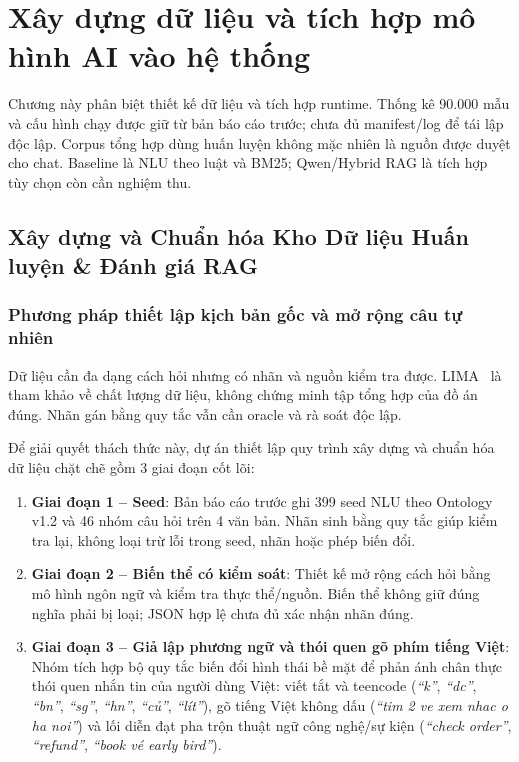 \chapter{Xây dựng dữ liệu và tích hợp mô hình AI vào hệ thống}
\label{chap:training_integration}

Chương này phân biệt thiết kế dữ liệu và tích hợp runtime. Thống kê 90.000 mẫu và cấu hình chạy được giữ từ bản báo cáo trước; chưa đủ manifest/log để tái lập độc lập. Corpus tổng hợp dùng huấn luyện không mặc nhiên là nguồn được duyệt cho chat. Baseline là NLU theo luật và BM25; Qwen/Hybrid RAG là tích hợp tùy chọn còn cần nghiệm thu.

\section{Xây dựng và Chuẩn hóa Kho Dữ liệu Huấn luyện \& Đánh giá RAG}
\label{sec:data_generator_pipeline}

\subsection{Phương pháp thiết lập kịch bản gốc và mở rộng câu tự nhiên}

Dữ liệu cần đa dạng cách hỏi nhưng có nhãn và nguồn kiểm tra được. LIMA~\cite{lima_zhou_2023} là tham khảo về chất lượng dữ liệu, không chứng minh tập tổng hợp của đồ án đúng. Nhãn gán bằng quy tắc vẫn cần oracle và rà soát độc lập.

Để giải quyết thách thức này, dự án thiết lập quy trình xây dựng và chuẩn hóa dữ liệu chặt chẽ gồm 3 giai đoạn cốt lõi:
\begin{enumerate}[nosep]
  \item \textbf{Giai đoạn 1 -- Seed}: Bản báo cáo trước ghi 399 seed NLU theo Ontology v1.2 và 46 nhóm câu hỏi trên 4 văn bản. Nhãn sinh bằng quy tắc giúp kiểm tra lại, không loại trừ lỗi trong seed, nhãn hoặc phép biến đổi.
  \item \textbf{Giai đoạn 2 -- Biến thể có kiểm soát}: Thiết kế mở rộng cách hỏi bằng mô hình ngôn ngữ và kiểm tra thực thể/nguồn. Biến thể không giữ đúng nghĩa phải bị loại; JSON hợp lệ chưa đủ xác nhận nhãn đúng.
  \item \textbf{Giai đoạn 3 -- Giả lập phương ngữ và thói quen gõ phím tiếng Việt}: Nhóm tích hợp bộ quy tắc biến đổi hình thái bề mặt để phản ánh chân thực thói quen nhắn tin của người dùng Việt: viết tắt và teencode (\textit{``k''}, \textit{``dc''}, \textit{``bn''}, \textit{``sg''}, \textit{``hn''}, \textit{``củ''}, \textit{``lít''}), gõ tiếng Việt không dấu (\textit{``tim 2 ve xem nhac o ha noi''}) và lối diễn đạt pha trộn thuật ngữ công nghệ/sự kiện (\textit{``check order''}, \textit{``refund''}, \textit{``book vé early bird''}).
\end{enumerate}

